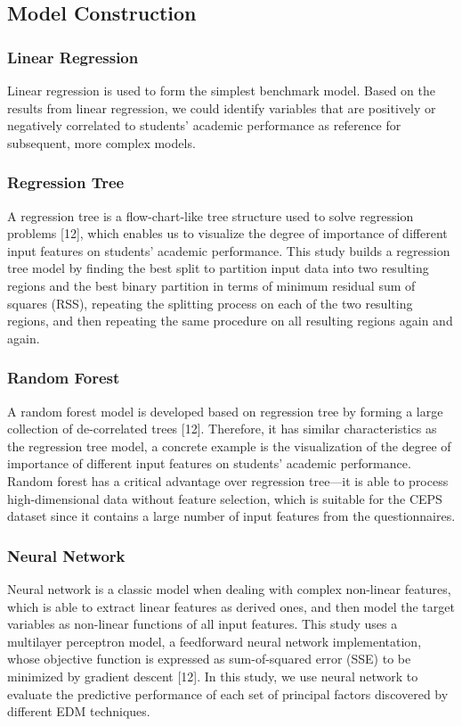 \documentclass[conference]{IEEEtran}
\begin{document}
\subsection{Model Construction}
\subsubsection{Linear Regression}
Linear regression is used to form the simplest benchmark model. Based on the results from linear regression, we could identify variables that are positively or negatively correlated to students' academic performance as reference for subsequent, more complex models. 
\subsubsection{Regression Tree}
A regression tree is a flow-chart-like tree structure used to solve regression problems [12], which enables us to visualize the degree of importance of different input features on students’ academic performance. This study builds a regression tree model by finding the best split to partition input data into two resulting regions and the best binary partition in terms of minimum residual sum of squares (RSS), repeating the splitting process on each of the two resulting regions, and then repeating the same procedure on all resulting regions again and again.
\subsubsection{Random Forest}
A random forest model is developed based on regression tree by forming a large collection of de-correlated trees [12]. Therefore, it has similar characteristics as the regression tree model, a concrete example is the visualization of the degree of importance of different input features on students’ academic performance. Random forest has a critical advantage over regression tree—it is able to process high-dimensional data without feature selection, which is suitable for the CEPS dataset since it contains a large number of input features from the questionnaires.
\subsubsection{Neural Network}
Neural network is a classic model when dealing with complex non-linear features, which is able to extract linear features as derived ones, and then model the target variables as non-linear functions of all input features. This study uses a multilayer perceptron model, a feedforward neural network implementation, whose objective function is expressed as sum-of-squared error (SSE) to be minimized by gradient descent [12]. In this study, we use neural network to evaluate the predictive performance of each set of principal factors discovered by different EDM techniques.
\end{document}
